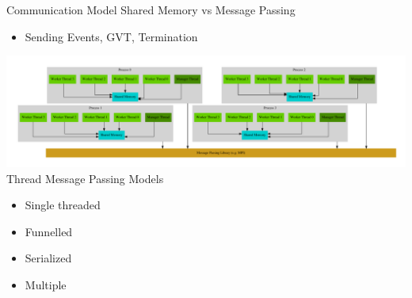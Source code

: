 \documentclass[10pt]{beamer}
\begin{document}
\begin{frame}{Communication Model}
    Shared Memory vs Message Passing
    \begin{itemize}
        \item Sending Events, GVT, Termination
    \end{itemize}
    \includegraphics[width=\textwidth]{../figs/graphviz/warped_communication.pdf} \\
    Thread Message Passing Models
    \begin{itemize}
        \item Single threaded
        \item Funnelled
        \item Serialized
        \item Multiple
    \end{itemize}
\end{frame}
\end{document}
